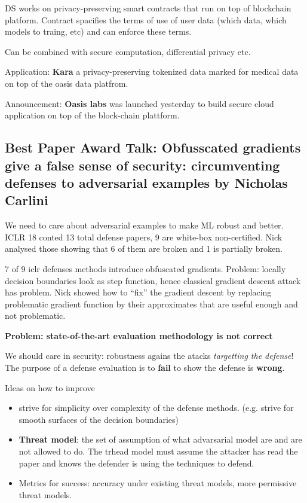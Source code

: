 \documentclass[11pt,oneside,a4paper]{scrartcl}
\begin{document}
DS works on privacy-preserving smart contracts that run on top of
blockchain platform. Contract spacifies the terms of use of user data
(which data, which models to traing, etc) and can enforce these terms.

Can be combined with secure computation, differential privacy etc.

Application: \textbf{Kara} a privacy-preserving tokenized data marked for
medical data on top of the oasis data platfrom.


Announcement: \textbf{Oasis labs} was launched yesterday to build secure cloud
application on top of the block-chain plattform.

\subsection{Best Paper Award Talk: Obfusscated gradients give a false
sense of security: circumventing defenses to adversarial examples by
Nicholas Carlini}
\label{sec:best-paper}

We need to care about adversarial examples to make ML robust and
better. ICLR 18 conted 13 total defense papers, 9 are white-box
non-certified. Nick analysed those showing that 6 of them are broken
and 1 is partially broken.

7 of 9 iclr  defenses methods introduce obfuscated gradients. Problem:
locally decision boundaries look as step function, hence classical
gradient descent attack has problem. Nick showed how to ``fix'' the
gradient descent by replacing problematic gradient function by their
approximates that are useful enough and not problematic.

\textbf{Problem: state-of-the-art evaluation methodology is not
  correct}

We should care in security: robustness agains the atacks \emph{targetting
the defense}! The purpose of a defense evaluation is to \textbf{fail} to show
the defense is \textbf{wrong}.

Ideas on how to improve
\begin{itemize}
\item strive for simplicity over complexity of the defense
  methods. (e.g. strive for smooth surfaces of the decision
  boundaries)
\item \textbf{Threat model}: the set of assumption of what advarsarial model
  are and are not allowed to do. The trhead model must assume the
  attacker has read the paper and knows the defender is using the
  techniques to defend.
\item Metrics for success: accuracy under existing threat models, more
  permissive threat models.
\end{itemize}
\end{document}
